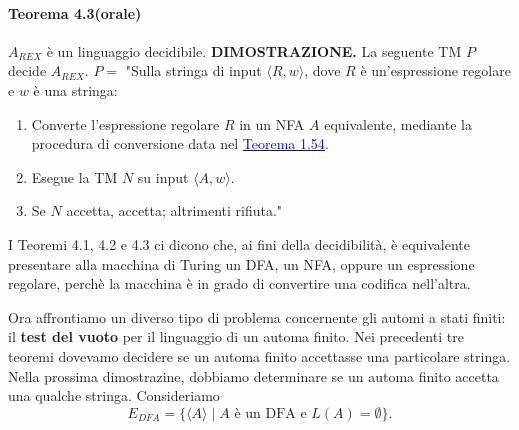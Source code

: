 \documentclass{article}
\begin{document}
\paragraph{Teorema 4.3(orale)}
\label{teorema-4.3}
$A_{REX}$ è un linguaggio decidibile.
\vspace{1em}
\text{}
\newline
\hbox{\textbf{DIMOSTRAZIONE.}}
La seguente TM $P$ decide $A_{REX}$.
\vspace{1em}
\text{}
\newline
$P = $ "Sulla stringa di input $\langle R,w \rangle$, dove $R$ è un'espressione regolare e $w$ è una stringa:
\begin{enumerate}
    \item Converte l'espressione regolare $R$ in un NFA $A$ equivalente, mediante la procedura di conversione data nel \hyperref[teorema-1.54]{\textcolor{blue}{Teorema 1.54}}.
    \item Esegue la TM $N$ su input $\langle A,w \rangle$.
    \item Se $N$ accetta, accetta; altrimenti rifiuta."
\end{enumerate}
\vspace{1em}
\text{}
\newline
I Teoremi 4.1, 4.2 e 4.3 ci dicono che, ai fini della decidibilità, è equivalente presentare alla macchina di Turing un DFA, un NFA, oppure un espressione regolare, perchè la macchina è in grado di convertire una codifica nell'altra.

Ora affrontiamo un diverso tipo di problema concernente gli automi a stati finiti: il \textbf{test del vuoto} per il linguaggio di un automa finito.
Nei precedenti tre teoremi dovevamo decidere se un automa finito accettasse una particolare stringa.
Nella prossima dimostrazine, dobbiamo determinare se un automa finito accetta una qualche stringa.
Consideriamo
$$
E_{DFA} = \{\langle A \rangle \mid A \text{ è un DFA e } L(A) = \emptyset \}.
$$
\end{document}
